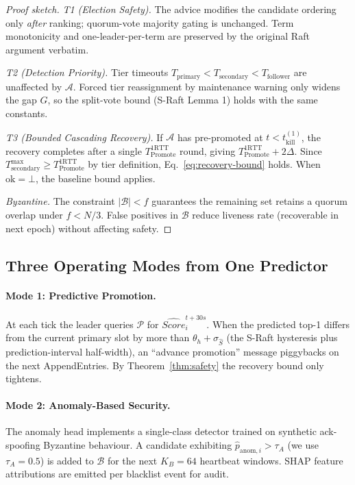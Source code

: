 \begin{proof}[Proof sketch]
\textit{T1 (Election Safety).} The advice modifies the candidate ordering
only \emph{after} ranking; quorum-vote majority gating is unchanged. Term
monotonicity and one-leader-per-term are preserved by the original Raft
argument verbatim.

\textit{T2 (Detection Priority).} Tier timeouts
$T_{\mathrm{primary}}\!<\!T_{\mathrm{secondary}}\!<\!T_{\mathrm{follower}}$
are unaffected by $\mathcal{A}$. Forced tier reassignment by maintenance
warning only widens the gap $G$, so the split-vote bound (S-Raft Lemma 1)
holds with the same constants.

\textit{T3 (Bounded Cascading Recovery).} If $\mathcal{A}$ has
pre-promoted at $t<t_{\mathrm{kill}}^{(1)}$, the recovery completes after
a single $T_{\mathrm{Promote}}^{1\mathrm{RTT}}$ round, giving
$T_{\mathrm{Promote}}^{1\mathrm{RTT}}+2\Delta$. Since
$T_{\mathrm{secondary}}^{\max}\ge T_{\mathrm{Promote}}^{1\mathrm{RTT}}$ by
tier definition, Eq.~\eqref{eq:recovery-bound} holds. When
$\text{ok}=\bot$, the baseline bound applies.

\textit{Byzantine.} The constraint $|\mathcal{B}|<f$ guarantees the
remaining set retains a quorum overlap under $f<N/3$. False positives in
$\mathcal{B}$ reduce liveness rate (recoverable in next epoch) without
affecting safety.
\end{proof}

\subsection{Three Operating Modes from One Predictor}

\paragraph{Mode 1: Predictive Promotion.}
At each tick the leader queries $\mathcal{P}$ for
$\widehat{Score}_i^{t+30s}$. When the predicted top-1 differs from the
current primary slot by more than $\theta_h+\sigma_{\widehat{S}}$ (the
S-Raft hysteresis plus prediction-interval half-width), an
``advance promotion'' message piggybacks on the next AppendEntries. By
Theorem~\ref{thm:safety} the recovery bound only tightens.

\paragraph{Mode 2: Anomaly-Based Security.}
The anomaly head implements a single-class detector trained on synthetic
ack-spoofing Byzantine behaviour. A candidate exhibiting
$\widehat{p}_{\mathrm{anom},i}>\tau_A$ (we use $\tau_A=0.5$) is added to
$\mathcal{B}$ for the next $K_B=64$ heartbeat windows. SHAP feature
attributions are emitted per blacklist event for audit.

